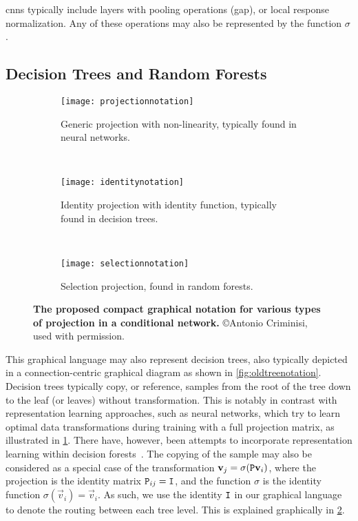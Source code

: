 \documentclass[thesis]{subfiles}
\begin{document}
	\Glspl{cnn} typically include layers with pooling operations (\eg \gls{gap}), or local response normalization. Any of these operations may also be represented by the function $\sigma$.
	
	\subsection{Decision Trees and Random Forests}
	
	\begin{figure}[tbp] 
		\centering
		\begin{subfigure}[b]{0.85\textwidth}
			\centering
			\texttt{[image: projectionnotation]}
			\caption{Generic projection with non-linearity, typically found in neural networks.}\label{fig:projectionnotation}
		\end{subfigure}
		~
		\begin{subfigure}[b]{0.85\textwidth}
			\centering
			\texttt{[image: identitynotation]}
			\caption{Identity projection with identity function, typically found in decision trees.}\label{fig:identitynotation}
		\end{subfigure}
		~
		\begin{subfigure}[b]{0.85\textwidth}
			\centering
			\texttt{[image: selectionnotation]}
			\caption{Selection projection, found in random forests.}\label{fig:selectionnotation}
		\end{subfigure}
		\caption[Various projection matrices in conditional networks]{\textbf{The proposed compact graphical notation for various types of projection in a conditional network.} \copyright Antonio Criminisi, used with permission.}\label{fig:projections}
	\end{figure}
	
	This graphical language may also represent decision trees, also typically depicted in a connection-centric graphical diagram as shown in \cref{fig:oldtreenotation}. Decision trees typically copy, or reference, samples from the root of the tree down to the leaf (or leaves) without transformation. This is notably in contrast with representation learning approaches, such as neural networks, which try to learn optimal data transformations during training with a full projection matrix, as illustrated in \cref{fig:projectionnotation}. There have, however, been attempts to incorporate representation learning within decision forests~\citep{montillo2011entangled,BuloKontsch2014}. The copying of the sample may also be considered as a special case of the transformation $\vec v_j = \sigma(\mat P \vec v_i)$, where the projection is the identity matrix $\mat P_{ij} = \mat I$, and the function $\sigma$ is the identity function $\sigma(\vec v_i) = \vec v_i$. As such, we use the identity $\mat I$ in our graphical language to denote the routing between each tree level. This is explained graphically in \cref{fig:identitynotation}.
	
\end{document}
